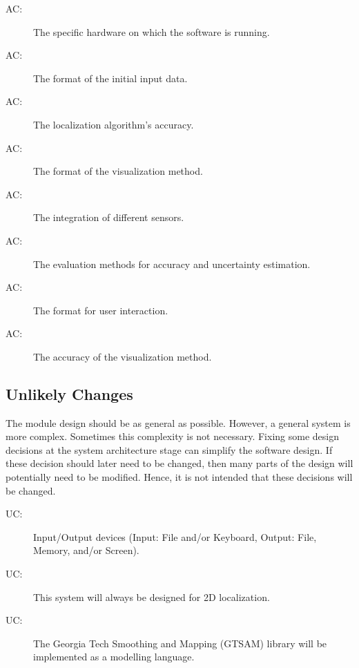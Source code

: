 \documentclass[12pt, titlepage]{article}
\newcounter{acnum}
\newcommand{\actheacnum}{AC\theacnum}
\newcounter{ucnum}
\newcommand{\uctheucnum}{UC\theucnum}
\begin{document}
\begin{description}
\item[ \actheacnum \label{acHardware}:] The specific hardware on which the software is running.
\item[ \actheacnum \label{acInput}:] The format of the initial input data.
\item[ \actheacnum \label{acLocalize}:] The localization algorithm's accuracy.

\item[ \actheacnum \label{acOutput}:] The format of the visualization method.

\item[ \actheacnum \label{acSF}:] The integration of different sensors.

\item[ \actheacnum \label{acAccurate}:] The evaluation methods for accuracy and uncertainty estimation.

\item[ \actheacnum \label{acControl}:] The format for user interaction.

\item[ \actheacnum \label{acPlot}:] The accuracy of the visualization method.

\end{description}


\subsection{Unlikely Changes} \label{SecUchange}

The module design should be as general as possible. However, a general system is
more complex. Sometimes this complexity is not necessary. Fixing some design
decisions at the system architecture stage can simplify the software design. If
these decision should later need to be changed, then many parts of the design
will potentially need to be modified. Hence, it is not intended that these
decisions will be changed.

\begin{description}
\item[ \uctheucnum \label{ucIO}:] Input/Output devices
  (Input: File and/or Keyboard, Output: File, Memory, and/or Screen).
\item[ \uctheucnum \label{uc2D}:] This system will always be designed for 2D localization.
\item[ \uctheucnum \label{ucGTSAM}:] The Georgia Tech Smoothing and Mapping (GTSAM) library will be implemented as a modelling language.
\end{description}
\end{document}
